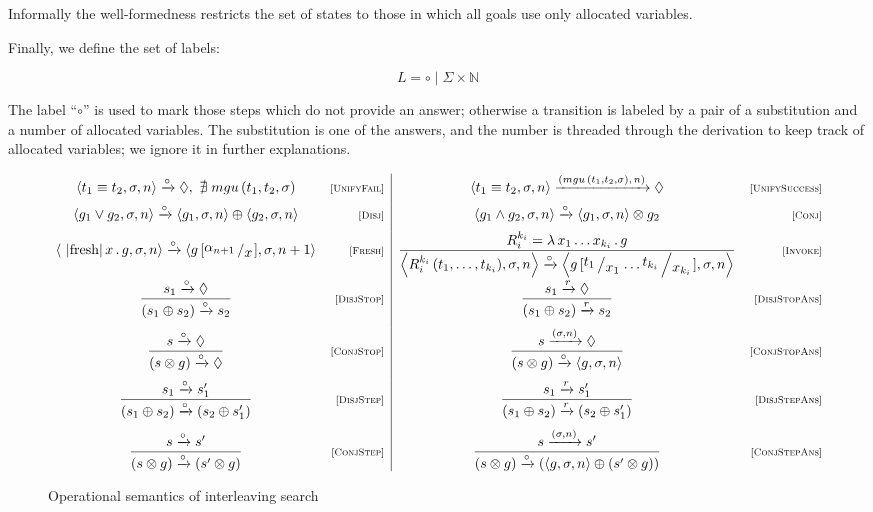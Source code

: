Informally the well-formedness restricts the set of states to those in which all goals use only allocated variables.

Finally, we define the set of labels:

\[
L = \circ \mid \Sigma\times \mathbb{N}
\]

The label ``$\circ$'' is used to mark those steps which do not provide an answer; otherwise a transition is labeled by a pair of a substitution and a number of allocated
variables. The substitution is one of the answers, and the number is threaded through the derivation to keep track of allocated variables; we ignore it in further explanations.

\begin{figure*}
  \[
  \begin{array}{cr|cr}
    \inbr{t_1 \equiv t_2, \sigma, n} \xrightarrow{\circ} \Diamond , \, \, \nexists\; mgu\,(t_1, t_2, \sigma) &\ruleno{UnifyFail} &
    \inbr{t_1 \equiv t_2, \sigma, n} \xrightarrow{(mgu\,(t_1, t_2, \sigma),\, n)} \Diamond & \ruleno{UnifySuccess} \\[2mm]
    \inbr{g_1 \lor g_2, \sigma, n} \xrightarrow{\circ} \inbr{g_1, \sigma, n} \oplus \inbr{g_2, \sigma, n} & \ruleno{Disj} &
    \inbr{g_1 \land g_2, \sigma, n} \xrightarrow{\circ} \inbr{ g_1, \sigma, n} \otimes g_2 & \ruleno{Conj} \\[2mm]
    \inbr{\mbox{\lstinline|fresh|}\, x\, .\, g, \sigma, n} \xrightarrow{\circ} \inbr{g\,[\bigslant{\alpha_{n + 1}}{x}], \sigma, n + 1} & \ruleno{Fresh} &
    \dfrac{R_i^{k_i}=\lambda\,x_1\dots x_{k_i}\,.\,g}{\inbr{R_i^{k_i}\,(t_1,\dots,t_{k_i}),\sigma,n} \xrightarrow{\circ} \inbr{g\,[\bigslant{t_1}{x_1}\dots\bigslant{t_{k_i}}{x_{k_i}}], \sigma, n}} & \ruleno{Invoke}\\[5mm]
    \dfrac{s_1 \xrightarrow{\circ} \Diamond}{(s_1 \oplus s_2) \xrightarrow{\circ} s_2} & \ruleno{DisjStop} &
    \dfrac{s_1 \xrightarrow{r} \Diamond}{(s_1 \oplus s_2) \xrightarrow{r} s_2} & \ruleno{DisjStopAns}\\[5mm]
    \dfrac{s \xrightarrow{\circ} \Diamond}{(s \otimes g) \xrightarrow{\circ} \Diamond} &\ruleno{ConjStop} &
    \dfrac{s \xrightarrow{(\sigma, n)} \Diamond}{(s \otimes g) \xrightarrow{\circ} \inbr{g, \sigma, n}}  & \ruleno{ConjStopAns}\\[5mm]
    \dfrac{s_1 \xrightarrow{\circ} s'_1}{(s_1 \oplus s_2) \xrightarrow{\circ} (s_2 \oplus s'_1)} &\ruleno{DisjStep} &
    \dfrac{s_1 \xrightarrow{r} s'_1}{(s_1 \oplus s_2) \xrightarrow{r} (s_2 \oplus s'_1)} &\ruleno{DisjStepAns}\\[5mm]
    \dfrac{s \xrightarrow{\circ} s'}{(s \otimes g) \xrightarrow{\circ} (s' \otimes g)} &\ruleno{ConjStep} &
    \dfrac{s \xrightarrow{(\sigma, n)} s'}{(s \otimes g) \xrightarrow{\circ} (\inbr{g, \sigma, n} \oplus (s' \otimes g))} & \ruleno{ConjStepAns} 
  \end{array}
  \]
  \caption{Operational semantics of interleaving search}
  \label{lts}
\end{figure*}

